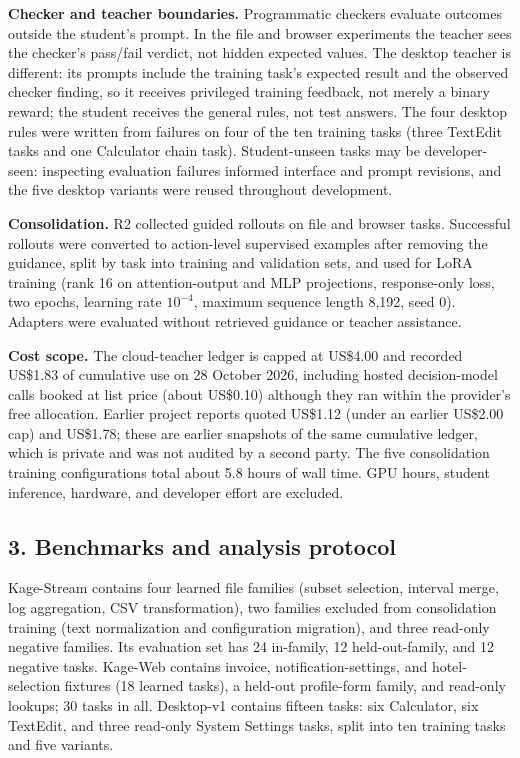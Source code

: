 \documentclass[
  10pt,
]{article}
\begin{document}
\textbf{Checker and teacher boundaries.} Programmatic checkers evaluate
outcomes outside the student's prompt. In the file and browser
experiments the teacher sees the checker's pass/fail verdict, not hidden
expected values. The desktop teacher is different: its prompts include
the training task's expected result and the observed checker finding, so
it receives privileged training feedback, not merely a binary reward;
the student receives the general rules, not test answers. The four
desktop rules were written from failures on four of the ten training
tasks (three TextEdit tasks and one Calculator chain task).
Student-unseen tasks may be developer-seen: inspecting evaluation
failures informed interface and prompt revisions, and the five desktop
variants were reused throughout development.

\textbf{Consolidation.} R2 collected guided rollouts on file and browser
tasks. Successful rollouts were converted to action-level supervised
examples after removing the guidance, split by task into training and
validation sets, and used for LoRA training (rank 16 on attention-output
and MLP projections, response-only loss, two epochs, learning rate
\(10^{-4}\), maximum sequence length 8,192, seed 0). Adapters were
evaluated without retrieved guidance or teacher assistance.

\textbf{Cost scope.} The cloud-teacher ledger is capped at US\$4.00 and
recorded US\$1.83 of cumulative use on 28 October 2026, including hosted
decision-model calls booked at list price (about US\$0.10) although they
ran within the provider's free allocation. Earlier project reports
quoted US\$1.12 (under an earlier US\$2.00 cap) and US\$1.78; these are
earlier snapshots of the same cumulative ledger, which is private and
was not audited by a second party. The five consolidation training
configurations total about 5.8 hours of wall time. GPU hours, student
inference, hardware, and developer effort are excluded.

\subsection{3. Benchmarks and analysis
protocol}\label{benchmarks-and-analysis-protocol}

Kage-Stream contains four learned file families (subset selection,
interval merge, log aggregation, CSV transformation), two families
excluded from consolidation training (text normalization and
configuration migration), and three read-only negative families. Its
evaluation set has 24 in-family, 12 held-out-family, and 12 negative
tasks. Kage-Web contains invoice, notification-settings, and
hotel-selection fixtures (18 learned tasks), a held-out profile-form
family, and read-only lookups; 30 tasks in all. Desktop-v1 contains
fifteen tasks: six Calculator, six TextEdit, and three read-only System
Settings tasks, split into ten training tasks and five variants.
\end{document}
